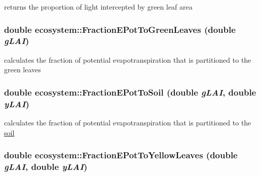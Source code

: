 returns the proportion of light intercepted by green leaf area \hypertarget{classecosystem_afcfa64eac43a10c5a4bedcc74ce933ce}{
\subsubsection[{FractionEPotToGreenLeaves}]{\setlength{\rightskip}{0pt plus 5cm}double ecosystem::FractionEPotToGreenLeaves (double {\em gLAI})}}
\label{classecosystem_afcfa64eac43a10c5a4bedcc74ce933ce}


calculates the fraction of potential evapotranspiration that is partitioned to the green leaves \hypertarget{classecosystem_a225153ac450b442797c2485c0cd991a4}{
\subsubsection[{FractionEPotToSoil}]{\setlength{\rightskip}{0pt plus 5cm}double ecosystem::FractionEPotToSoil (double {\em gLAI}, \/  double {\em yLAI})}}
\label{classecosystem_a225153ac450b442797c2485c0cd991a4}


calculates the fraction of potential evapotranspiration that is partitioned to the \hyperlink{classsoil}{soil} \hypertarget{classecosystem_a247d1f0772f29aed1a37a277f15eecf6}{
\subsubsection[{FractionEPotToYellowLeaves}]{\setlength{\rightskip}{0pt plus 5cm}double ecosystem::FractionEPotToYellowLeaves (double {\em gLAI}, \/  double {\em yLAI})}}
\label{classecosystem_a247d1f0772f29aed1a37a277f15eecf6}


